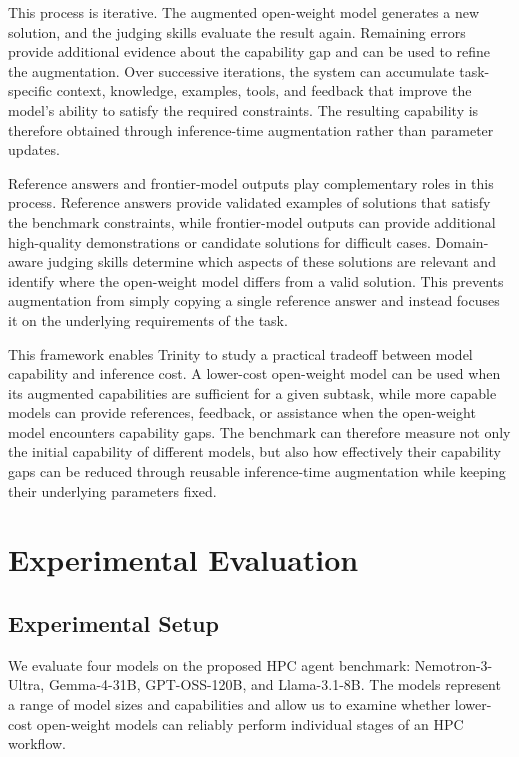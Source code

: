 \documentclass[conference]{IEEEtran}
\begin{document}
This process is iterative. The augmented open-weight model generates a new solution, and the judging skills evaluate the result again. Remaining errors provide additional evidence about the capability gap and can be used to refine the augmentation. Over successive iterations, the system can accumulate task-specific context, knowledge, examples, tools, and feedback that improve the model's ability to satisfy the required constraints. The resulting capability is therefore obtained through inference-time augmentation rather than parameter updates.

Reference answers and frontier-model outputs play complementary roles in this process. Reference answers provide validated examples of solutions that satisfy the benchmark constraints, while frontier-model outputs can provide additional high-quality demonstrations or candidate solutions for difficult cases. Domain-aware judging skills determine which aspects of these solutions are relevant and identify where the open-weight model differs from a valid solution. This prevents augmentation from simply copying a single reference answer and instead focuses it on the underlying requirements of the task.

This framework enables Trinity to study a practical tradeoff between model capability and inference cost. A lower-cost open-weight model can be used when its augmented capabilities are sufficient for a given subtask, while more capable models can provide references, feedback, or assistance when the open-weight model encounters capability gaps. The benchmark can therefore measure not only the initial capability of different models, but also how effectively their capability gaps can be reduced through reusable inference-time augmentation while keeping their underlying parameters fixed.

\section{Experimental Evaluation}
\label{sec:eval}
 
\subsection{Experimental Setup}
We evaluate four models on the proposed HPC agent benchmark: Nemotron-3-Ultra, Gemma-4-31B, GPT-OSS-120B, and Llama-3.1-8B. The models represent a range of model sizes and capabilities and allow us to examine whether lower-cost open-weight models can reliably perform individual stages of an HPC workflow.
 
\end{document}
